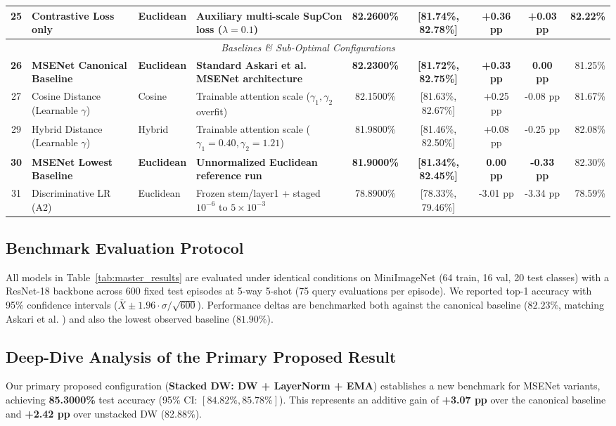 \documentclass[conference]{IEEEtran}
\begin{document}
\begin{table}[t]
{\begin{tabular}{clllccccr}
25 & Contrastive Loss only & Euclidean & Auxiliary multi-scale SupCon loss ($\lambda=0.1$) & 82.2600\% & [81.74\%, 82.78\%] & +0.36 pp & +0.03 pp & 82.22\% \\
\midrule
\multicolumn{9}{c}{\textit{Baselines \& Sub-Optimal Configurations}} \\
\midrule
\textbf{26} & \textbf{MSENet Canonical Baseline} & \textbf{Euclidean} & \textbf{Standard Askari et al. MSENet architecture} & \textbf{82.2300\%} & \textbf{[81.72\%, 82.75\%]} & \textbf{+0.33 pp} & \textbf{0.00 pp} & 81.25\% \\
27 & Cosine Distance (Learnable $\gamma$) & Cosine & Trainable attention scale ($\gamma_1, \gamma_2$ overfit) & 82.1500\% & [81.63\%, 82.67\%] & +0.25 pp & -0.08 pp & 81.67\% \\
29 & Hybrid Distance (Learnable $\gamma$) & Hybrid & Trainable attention scale ($\gamma_1=0.40, \gamma_2=1.21$) & 81.9800\% & [81.46\%, 82.50\%] & +0.08 pp & -0.25 pp & 82.08\% \\
\textbf{30} & \textbf{MSENet Lowest Baseline} & \textbf{Euclidean} & \textbf{Unnormalized Euclidean reference run} & \textbf{81.9000\%} & \textbf{[81.34\%, 82.45\%]} & \textbf{0.00 pp} & \textbf{-0.33 pp} & 82.30\% \\
31 & Discriminative LR (A2) & Euclidean & Frozen stem/layer1 + staged $10^{-6}$ to $5\times 10^{-3}$ & 78.8900\% & [78.33\%, 79.46\%] & -3.01 pp & -3.34 pp & 78.59\% \\
\bottomrule
\end{tabular}
}
\end{table}

\subsection{Benchmark Evaluation Protocol}
All models in Table~\ref{tab:master_results} are evaluated under identical conditions on MiniImageNet (64 train, 16 val, 20 test classes) with a ResNet-18 backbone across 600 fixed test episodes at 5-way 5-shot (75 query evaluations per episode). We reported top-1 accuracy with 95\% confidence intervals ($\bar{X} \pm 1.96 \cdot \sigma / \sqrt{600}$). Performance deltas are benchmarked both against the canonical baseline ($\mathbf{82.23\%}$, matching Askari et al. \cite{askari2023enhancing}) and also the lowest observed baseline ($\mathbf{81.90\%}$).

\subsection{Deep-Dive Analysis of the Primary Proposed Result}
Our primary proposed configuration (\textbf{Stacked DW: DW + LayerNorm + EMA}) establishes a new benchmark for MSENet variants, achieving \textbf{85.3000\%} test accuracy (95\% CI: $[84.82\%, 85.78\%]$). This represents an additive gain of \textbf{+3.07 pp} over the canonical baseline and \textbf{+2.42 pp} over unstacked DW (82.88\%). 
\end{document}
